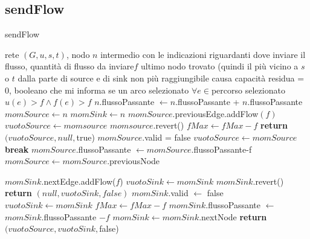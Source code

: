 \documentclass{article}
\begin{document}
\subsection{sendFlow}
\begin{algorithm}
    \caption{sendFlow}
    \begin{algorithmic}
        \REQUIRE rete $(G,u,s,t)$, nodo $n$ intermedio con le indicazioni riguardanti dove inviare il flusso, quantità di flusso da inviare$f$
        \ENSURE ultimo nodo trovato (quindi il più vicino a $s$ o $t$ dalla parte di source e di sink non più raggiungibile causa capacità residua = 0, booleano che mi informa se un arco selezionato $\forall e \in $percorso selezionato $u(e)> f \land f(e)>f$
        \STATE $n$.flussoPassante $\leftarrow n.$flussoPassante + $n$.flussoPassante
        \STATE $momSource \leftarrow n$
        \STATE $momSink \leftarrow n$
        \STATE $momSource$.previousEdge.addFlow$(f)$
        \STATE $vuotoSource \leftarrow momsource$
        \STATE $momsource$.revert() 
        \STATE $fMax \leftarrow fMax - f$
        \STATE \textbf{return} $(vuotoSource,null,$true)
        \ELSE
        \STATE $momSource$.valid = false
        \STATE $vuotoSource \leftarrow momSource$
        \STATE \textbf{break}
        \ENDIF
        \STATE $momSource.$flussoPassante $\leftarrow momSource.$flussoPassante-f
        \STATE $momSource \leftarrow momSource.$previousNode
        \ENDIF
        \ENDWHILE

        \STATE $momSink$.nextEdge.addFlow($f$)
        \STATE $vuotoSink \leftarrow momSink$
        \STATE $momSink$.revert() 
        \STATE \textbf{return} $(null,vuotoSink,false)$
        \ELSE
        \STATE $momSink.$valid $\leftarrow$ false
        \STATE $vuotoSink \leftarrow momSink$
        \STATE $fMax \leftarrow fMax - f$
        \ENDIF
        \STATE $momSink$.flussoPassante $\leftarrow$ $momSink$.flussoPassante $-f$
        \STATE $momSink \leftarrow momSink.$nextNode
        \ENDIF
        \ENDWHILE
        \STATE \textbf{return} $(vuotoSource,vuotoSink,$false)
    \end{algorithmic}
\end{algorithm}
\end{document}
